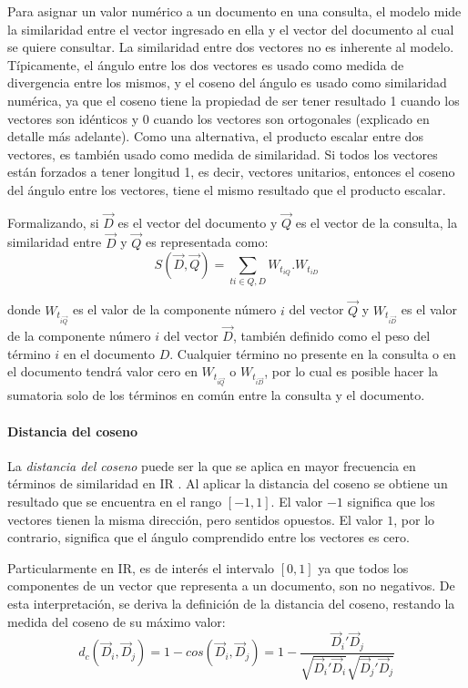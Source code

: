 \bigskip Para asignar un valor numérico a un documento en una consulta, el modelo mide la similaridad entre el vector ingresado en ella y el vector del documento al cual se quiere consultar. La similaridad entre dos vectores no es inherente al modelo. Típicamente, el ángulo entre los dos vectores es usado como medida de divergencia entre los mismos, y el coseno del ángulo es usado como similaridad numérica, ya que el coseno tiene la propiedad de ser tener resultado 1 cuando los vectores son idénticos y 0 cuando los vectores son ortogonales (explicado en detalle más adelante). Como una alternativa, el producto escalar entre dos vectores, es también usado como medida de similaridad. Si todos los vectores están forzados a tener longitud 1, es decir, vectores unitarios, entonces el coseno del ángulo entre los vectores, tiene el mismo resultado que el producto escalar.

\bigskip Formalizando, si \(\overrightarrow{D}\) es el vector del documento y \(\overrightarrow{Q}\) es el vector de la consulta, la similaridad entre \(\overrightarrow{D}\) y \(\overrightarrow{Q}\) es representada como:
\[S(\vec{D},\vec{Q})=\sum_{ti \in Q,D}^{ }{W_{t_{iQ}}.W_{t_{iD}}}\]

donde \(W_{t_{i \overrightarrow{Q}}}\) es el valor de la componente número \(i\) del vector \(\overrightarrow{Q}\) y \(W_{t_{i \overrightarrow{D}}}\) es el valor de la componente número \(i\) del vector \(\overrightarrow{D}\), también definido como el peso del término \(i\) en el documento \(D\). Cualquier término no presente en la consulta o en el documento tendrá valor cero en \(W_{t_{i \overrightarrow{Q}}}\) o \(W_{t_{i \overrightarrow{D}}}\), por lo cual es posible hacer la sumatoria solo de los términos en común entre la consulta y el documento.

\paragraph{Distancia del coseno}
La \textit{distancia del coseno} puede ser la que se aplica en mayor frecuencia en términos de similaridad en IR \citep{korenius2007principal}. Al aplicar la distancia del coseno se obtiene un resultado que se encuentra en el rango \([-1, 1]\). El valor \(-1\) significa que los vectores tienen la misma dirección, pero sentidos opuestos. El valor \(1\), por lo contrario, significa que el ángulo comprendido entre los vectores es cero.

\bigskip Particularmente en IR, es de interés el intervalo \([0, 1]\) ya que todos los componentes de un vector que representa a un documento, son no negativos. De esta interpretación, se deriva la definición de la distancia del coseno, restando la medida del coseno de su máximo valor:
\[d_c(\vec{D}_i, \vec{D}_j) = 1 - cos(\vec{D}_i, \vec{D}_j) = 1 - \frac{{\vec{D}_i}'\vec{D}_j}{\sqrt{{\vec{D}_i}'\vec{D}_i}\sqrt{{\vec{D}_j}'\vec{D}_j}}\]


